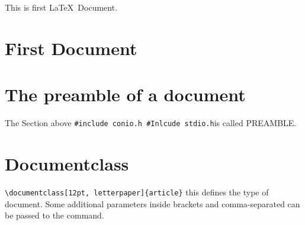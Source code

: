 \documentclass{book}
\begin{document}
This is first \LaTeX\ Document. 

\section{First Document}


\section{The preamble of a document} 
The Section above 
\verb|#include conio.h #Inlcude stdio.h|is called PREAMBLE.

\section{Documentclass}
\verb|\documentclass[12pt, letterpaper]{article}|
this defines the type of document. Some additional parameters inside brackets and comma-separated can be passed to the command.
\end{document}
